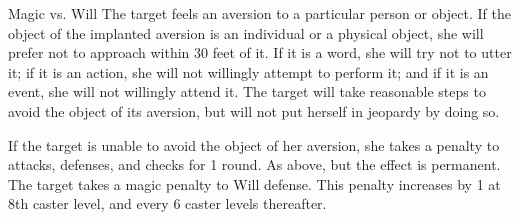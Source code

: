 \begin{spellheader}
\end{spellheader}
\begin{spellcontent}
    \begin{spelltargetinginfo}
    \end{spelltargetinginfo}
    \begin{spelleffects}
        \begin{spellattack}{Magic vs. Will}
            \spellsuccess The target feels an aversion to a particular person or object. If the object of the implanted aversion is an individual or a physical object, she will prefer not to approach within 30 feet of it. If it is a word, she will try not to utter it; if it is an action, she will not willingly attempt to perform it; and if it is an event, she will not willingly attend it. The target will take reasonable steps to avoid the object of its aversion, but will not put herself in jeopardy by doing so.
            \par If the target is unable to avoid the object of her aversion, she takes a  penalty to attacks, defenses, and checks for 1 round.
            \spellcritical As above, but the effect is permanent.
            \spellfailure The target takes a  magic penalty to Will defense. This penalty increases by 1 at 8th caster level, and every 6 caster levels thereafter.
        \end{spellattack}
    \end{spelleffects}
\end{spellcontent}
\begin{spellfooter}

\end{spellfooter}

\begin{comment}
\subsubsection{B}
\end{comment}


